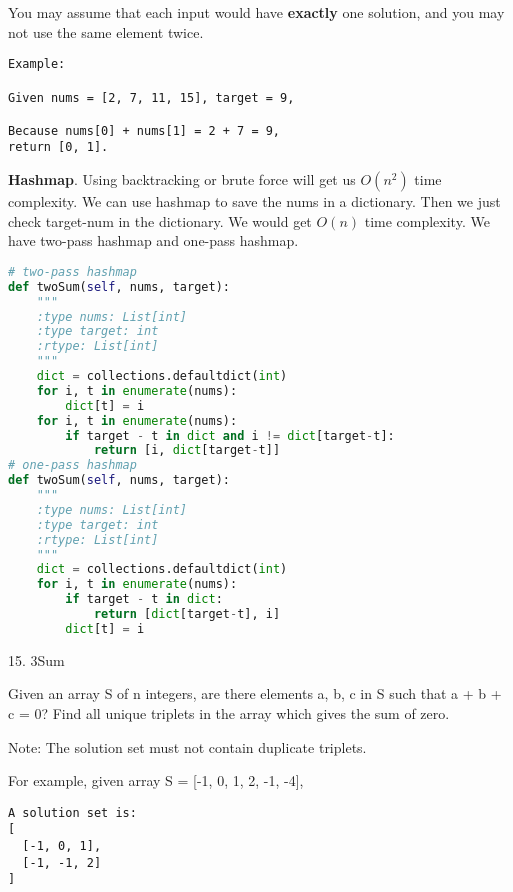 \documentclass[../../question_3_array_question.tex]{subfiles}
\begin{document}
You may assume that each input would have \textbf{exactly} one solution, and you may not use the same element twice.
\begin{lstlisting}
Example:

Given nums = [2, 7, 11, 15], target = 9,

Because nums[0] + nums[1] = 2 + 7 = 9,
return [0, 1].
\end{lstlisting}
\textbf{Hashmap}. Using backtracking or brute force will get us $O(n^2)$ time complexity. We can use hashmap to save the nums in a dictionary. Then we just check target-num in the dictionary. We would get $O(n)$ time complexity. We have two-pass hashmap and one-pass hashmap.
\begin{lstlisting}[language=Python]
# two-pass hashmap
def twoSum(self, nums, target):
    """
    :type nums: List[int]
    :type target: int
    :rtype: List[int]
    """
    dict = collections.defaultdict(int)
    for i, t in enumerate(nums):
        dict[t] = i
    for i, t in enumerate(nums):
        if target - t in dict and i != dict[target-t]:
            return [i, dict[target-t]]
# one-pass hashmap
def twoSum(self, nums, target):
    """
    :type nums: List[int]
    :type target: int
    :rtype: List[int]
    """
    dict = collections.defaultdict(int)
    for i, t in enumerate(nums):
        if target - t in dict:
            return [dict[target-t], i]
        dict[t] = i
\end{lstlisting}

15. 3Sum

Given an array S of n integers, are there elements a, b, c in S such that a + b + c = 0? Find all unique triplets in the array which gives the sum of zero.

Note: The solution set must not contain duplicate triplets.

For example, given array S = [-1, 0, 1, 2, -1, -4],
\begin{lstlisting}
A solution set is:
[
  [-1, 0, 1],
  [-1, -1, 2]
]
\end{lstlisting}
\end{document}

